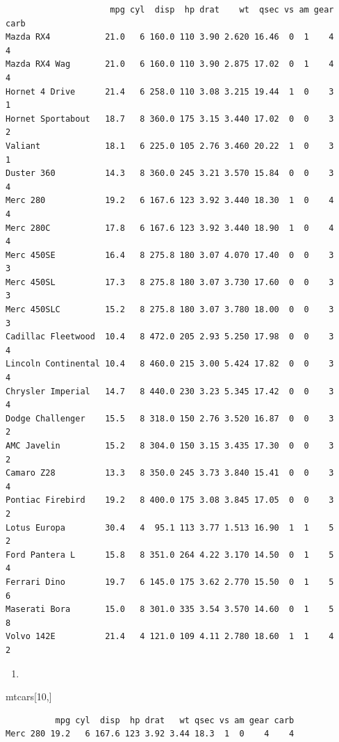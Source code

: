 \documentclass[
  letterpaper,
  DIV=11,
  numbers=noendperiod]{scrreprt}
\newenvironment{Shaded}{\begin{snugshade}}{\end{snugshade}}
\newcommand{\DecValTok}[1]{\textcolor[rgb]{0.68,0.00,0.00}{#1}}
\newcommand{\NormalTok}[1]{\textcolor[rgb]{0.00,0.23,0.31}{#1}}
\providecommand{\tightlist}{%
  \setlength{\itemsep}{0pt}\setlength{\parskip}{0pt}}\usepackage{longtable,booktabs,array}
\begin{document}
\begin{verbatim}
                     mpg cyl  disp  hp drat    wt  qsec vs am gear carb
Mazda RX4           21.0   6 160.0 110 3.90 2.620 16.46  0  1    4    4
Mazda RX4 Wag       21.0   6 160.0 110 3.90 2.875 17.02  0  1    4    4
Hornet 4 Drive      21.4   6 258.0 110 3.08 3.215 19.44  1  0    3    1
Hornet Sportabout   18.7   8 360.0 175 3.15 3.440 17.02  0  0    3    2
Valiant             18.1   6 225.0 105 2.76 3.460 20.22  1  0    3    1
Duster 360          14.3   8 360.0 245 3.21 3.570 15.84  0  0    3    4
Merc 280            19.2   6 167.6 123 3.92 3.440 18.30  1  0    4    4
Merc 280C           17.8   6 167.6 123 3.92 3.440 18.90  1  0    4    4
Merc 450SE          16.4   8 275.8 180 3.07 4.070 17.40  0  0    3    3
Merc 450SL          17.3   8 275.8 180 3.07 3.730 17.60  0  0    3    3
Merc 450SLC         15.2   8 275.8 180 3.07 3.780 18.00  0  0    3    3
Cadillac Fleetwood  10.4   8 472.0 205 2.93 5.250 17.98  0  0    3    4
Lincoln Continental 10.4   8 460.0 215 3.00 5.424 17.82  0  0    3    4
Chrysler Imperial   14.7   8 440.0 230 3.23 5.345 17.42  0  0    3    4
Dodge Challenger    15.5   8 318.0 150 2.76 3.520 16.87  0  0    3    2
AMC Javelin         15.2   8 304.0 150 3.15 3.435 17.30  0  0    3    2
Camaro Z28          13.3   8 350.0 245 3.73 3.840 15.41  0  0    3    4
Pontiac Firebird    19.2   8 400.0 175 3.08 3.845 17.05  0  0    3    2
Lotus Europa        30.4   4  95.1 113 3.77 1.513 16.90  1  1    5    2
Ford Pantera L      15.8   8 351.0 264 4.22 3.170 14.50  0  1    5    4
Ferrari Dino        19.7   6 145.0 175 3.62 2.770 15.50  0  1    5    6
Maserati Bora       15.0   8 301.0 335 3.54 3.570 14.60  0  1    5    8
Volvo 142E          21.4   4 121.0 109 4.11 2.780 18.60  1  1    4    2
\end{verbatim}

\begin{enumerate}
\def\labelenumi{\alph{enumi})}
\setcounter{enumi}{6}
\tightlist
\item
\end{enumerate}

\begin{Shaded}
\begin{Highlighting}[]
\NormalTok{mtcars[}\DecValTok{10}\NormalTok{,]}
\end{Highlighting}
\end{Shaded}

\begin{verbatim}
          mpg cyl  disp  hp drat   wt qsec vs am gear carb
Merc 280 19.2   6 167.6 123 3.92 3.44 18.3  1  0    4    4
\end{verbatim}
\end{document}
